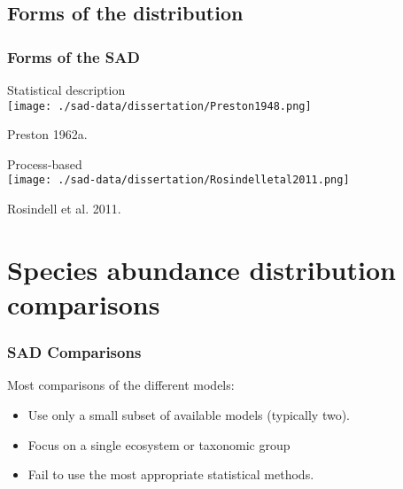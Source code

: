 \documentclass[14pt]{beamer}
\begin{document}
\subsection{Forms of the distribution}
\begin{frame}
\frametitle{Forms of the SAD}
Statistical description\\  
\texttt{[image: ./sad-data/dissertation/Preston1948.png]}\\

\begin{tiny}
Preston 1962a.\\
\end{tiny}

Process-based\\
\texttt{[image: ./sad-data/dissertation/Rosindelletal2011.png]}\\

\begin{tiny}
Rosindell et al. 2011.
\end{tiny}
\end{frame}
 

\section{Species abundance distribution comparisons}
\begin{frame}
\frametitle{SAD Comparisons}
\begin{large}
Most comparisons of the different models:
\end{large}
\begin{itemize}
\item Use only a small subset of available models (typically two).
\item Focus on a single ecosystem or taxonomic group
\item Fail to use the most appropriate statistical methods. 
\end{itemize}
\end{frame}
\end{document}
